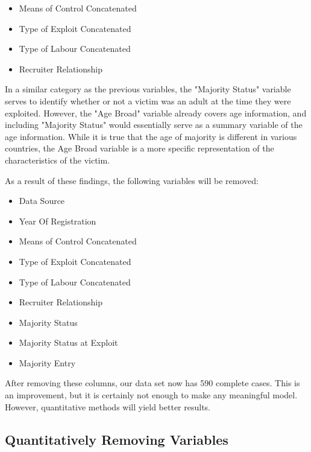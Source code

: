 \documentclass{article} %
\begin{document}
	\begin{multicols}{2}
		\begin{itemize}
			\item Means of Control Concatenated
			\item Type of Exploit Concatenated
			\item Type of Labour Concatenated
			\item Recruiter Relationship
		\end{itemize}
	\end{multicols}
	
	In a similar category as the previous variables, the "Majority Status" variable serves to identify whether or not a victim was an adult at the time they were exploited. However, the "Age Broad" variable already covers age information, and including "Majority Status" would essentially serve as a summary variable of the age information. While it is true that the age of majority is different in various countries, the Age Broad variable is a more specific representation of the characteristics of the victim.
	
	As a result of these findings, the following variables will be removed:
	
	\begin{multicols}{2}
		\begin{itemize}
		\item Data Source
		\item Year Of Registration
		\item Means of Control Concatenated
		\item Type of Exploit Concatenated
		\item Type of Labour Concatenated
		\item Recruiter Relationship
		\item Majority Status
		\item Majority Status at Exploit
		\item Majority Entry
	\end{itemize}
	\end{multicols}
	
	After removing these columns, our data set now has 590 complete cases. This is an improvement, but it is certainly not enough to make any meaningful model. However, quantitative methods will yield better results.

	
	\subsection{Quantitatively Removing Variables}
	
\end{document}

